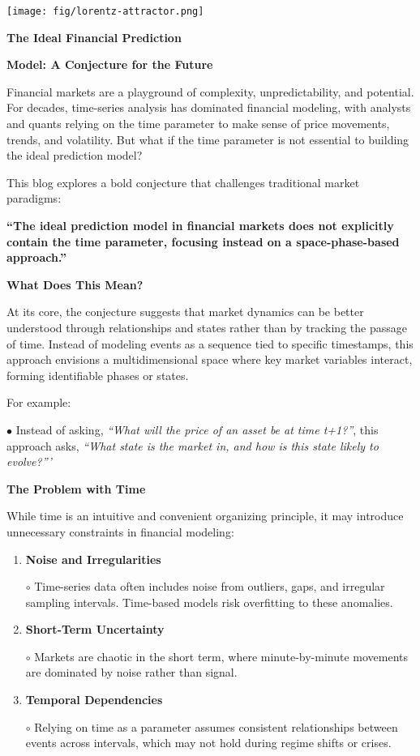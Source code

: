 \documentclass{article}
\newcommand{\bn}{\bigskip\noindent}
\newcommand{\mn}{\medskip\noindent}
\begin{document}
\begin{center}
\texttt{[image: fig/lorentz-attractor.png]}
\end{center}

\mn
{\huge\bf The Ideal Financial Prediction}

\mn
{\huge\bf Model: A Conjecture for the Future}

\bn
Financial markets are a playground of complexity, unpredictability, and potential. For decades, time-series analysis has dominated financial modeling, with analysts and quants relying on the time parameter to make sense of price movements, trends, and volatility. But what if the time parameter is not essential to building the ideal prediction model?

\bn
This blog explores a bold conjecture that challenges traditional market paradigms:

\bn
{\bf ``The ideal prediction model in financial markets does not explicitly contain the time parameter, focusing instead on a space-phase-based approach.''}

\bn
{\large\bf What Does This Mean?}

\bn
At its core, the conjecture suggests that market dynamics can be better understood through relationships and states rather than by tracking the passage of time. Instead of modeling events as a sequence tied to specific timestamps, this approach envisions a multidimensional space where key market variables interact, forming identifiable phases or states.

\bn
For example:

\bn
$\bullet$  Instead of asking,  \emph{``What will the price of an asset be at time t+1?''}, this approach asks, \emph{``What state is the market in, and how is this state likely to evolve?'''}


\bn
{\large\bf The Problem with Time}

\bn
While time is an intuitive and convenient organizing principle, it may introduce unnecessary constraints in financial modeling:

\begin{enumerate}[1.]
\item  {\bf Noise and Irregularities}

    $\circ$  Time-series data often includes noise from outliers, gaps, and irregular sampling intervals. Time-based models risk overfitting to these anomalies.

\item   {\bf Short-Term Uncertainty}

    $\circ$   Markets are chaotic in the short term, where minute-by-minute movements are dominated by noise rather than signal.

\item   {\bf Temporal Dependencies}

    $\circ$   Relying on time as a parameter assumes consistent relationships between events across intervals, which may not hold during regime shifts or crises.
\end{enumerate}
\end{document}

